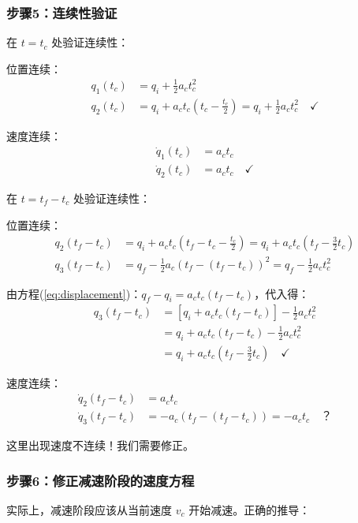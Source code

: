 \documentclass[12pt,a4paper]{article}
\begin{document}
\subsubsection{步骤5：连续性验证}

在 $t = t_c$ 处验证连续性：

位置连续：
\begin{align*}
    q_1(t_c) &= q_i + \frac{1}{2} a_c t_c^2 \\
    q_2(t_c) &= q_i + a_c t_c (t_c - \frac{t_c}{2}) = q_i + \frac{1}{2} a_c t_c^2 \quad \checkmark
\end{align*}

速度连续：
\begin{align*}
    \dot{q}_1(t_c) &= a_c t_c \\
    \dot{q}_2(t_c) &= a_c t_c \quad \checkmark
\end{align*}

在 $t = t_f - t_c$ 处验证连续性：

位置连续：
\begin{align*}
    q_2(t_f - t_c) &= q_i + a_c t_c (t_f - t_c - \frac{t_c}{2}) = q_i + a_c t_c (t_f - \frac{3}{2}t_c) \\
    q_3(t_f - t_c) &= q_f - \frac{1}{2} a_c (t_f - (t_f - t_c))^2 = q_f - \frac{1}{2} a_c t_c^2
\end{align*}

由方程(\ref{eq:displacement})：$q_f - q_i = a_c t_c (t_f - t_c)$，代入得：
\begin{align*}
    q_3(t_f - t_c) &= [q_i + a_c t_c (t_f - t_c)] - \frac{1}{2} a_c t_c^2 \\
    &= q_i + a_c t_c (t_f - t_c) - \frac{1}{2} a_c t_c^2 \\
    &= q_i + a_c t_c (t_f - \frac{3}{2}t_c) \quad \checkmark
\end{align*}

速度连续：
\begin{align*}
    \dot{q}_2(t_f - t_c) &= a_c t_c \\
    \dot{q}_3(t_f - t_c) &= -a_c (t_f - (t_f - t_c)) = -a_c t_c \quad \text{？}
\end{align*}

这里出现速度不连续！我们需要修正。

\subsubsection{步骤6：修正减速阶段的速度方程}

实际上，减速阶段应该从当前速度 $v_c$ 开始减速。正确的推导：
\end{document}
